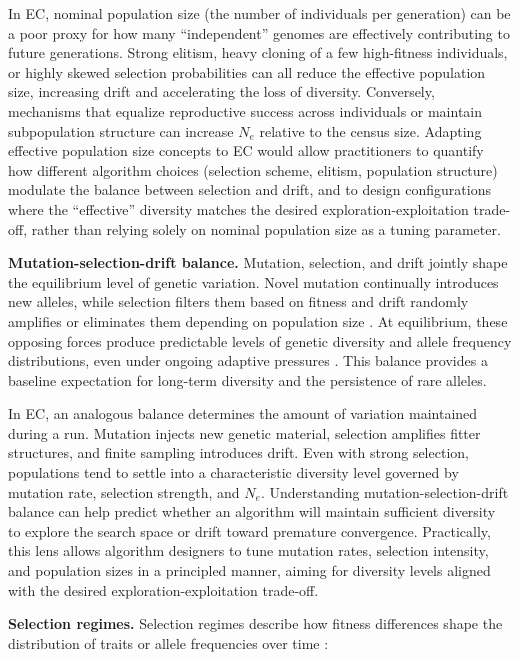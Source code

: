 In EC, nominal population size (the number of individuals per generation) can be a poor proxy for how many ``independent'' genomes are effectively contributing to future generations.
Strong elitism, heavy cloning of a few high-fitness individuals, or highly skewed selection probabilities can all reduce the effective population size, increasing drift and accelerating the loss of diversity.
Conversely, mechanisms that equalize reproductive success across individuals or maintain subpopulation structure can increase $N_e$ relative to the census size.
Adapting effective population size concepts to EC would allow practitioners to quantify how different algorithm choices (selection scheme, elitism, population structure) modulate the balance between selection and drift, and to design configurations where the ``effective'' diversity matches the desired exploration-exploitation trade-off, rather than relying solely on nominal population size as a tuning parameter.

\textbf{Mutation-selection-drift balance.}
Mutation, selection, and drift jointly shape the equilibrium level of genetic variation.
Novel mutation continually introduces new alleles, while selection filters them based on fitness and drift randomly amplifies or eliminates them depending on population size \citep{crow2017introduction, hamilton2021population}.
At equilibrium, these opposing forces produce predictable levels of genetic diversity and allele frequency distributions, even under ongoing adaptive pressures \citep{hamilton2021population}.
This balance provides a baseline expectation for long-term diversity and the persistence of rare alleles.

In EC, an analogous balance determines the amount of variation maintained during a run.
Mutation injects new genetic material, selection amplifies fitter structures, and finite sampling introduces drift.
Even with strong selection, populations tend to settle into a characteristic diversity level governed by mutation rate, selection strength, and $N_e$.
Understanding mutation-selection-drift balance can help predict whether an algorithm will maintain sufficient diversity to explore the search space or drift toward premature convergence.
Practically, this lens allows algorithm designers to tune mutation rates, selection intensity, and population sizes in a principled manner, aiming for diversity levels aligned with the desired exploration-exploitation trade-off.

\textbf{Selection regimes.}
Selection regimes describe how fitness differences shape the distribution of traits or allele frequencies over time \citep{hamilton2021population}:

